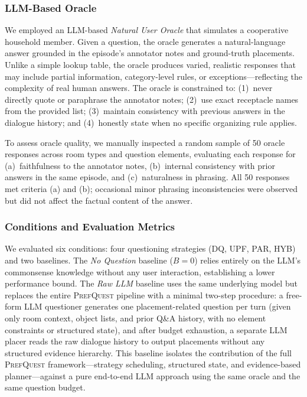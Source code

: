 \documentclass[manuscript,review,anonymous]{acmart}
\begin{document}
{\subsubsection{LLM-Based Oracle}

We employed an LLM-based \textit{Natural User Oracle} that simulates a cooperative household member. Given a question, the oracle generates a natural-language answer grounded in the episode's annotator notes and ground-truth placements. Unlike a simple lookup table, the oracle produces varied, realistic responses that may include partial information, category-level rules, or exceptions---reflecting the complexity of real human answers. The oracle is constrained to: (1)~never directly quote or paraphrase the annotator notes; (2)~use exact receptacle names from the provided list; (3)~maintain consistency with previous answers in the dialogue history; and (4)~honestly state when no specific organizing rule applies.

To assess oracle quality, we manually inspected a random sample of 50 oracle responses across room types and question elements, evaluating each response for (a)~faithfulness to the annotator notes, (b)~internal consistency with prior answers in the same episode, and (c)~naturalness in phrasing. All 50 responses met criteria (a) and (b); occasional minor phrasing inconsistencies were observed but did not affect the factual content of the answer.

\subsubsection{Conditions and Evaluation Metrics}

We evaluated six conditions: four questioning strategies (DQ, UPF, PAR, HYB) and two baselines. The \textit{No Question} baseline ($B=0$) relies entirely on the LLM's commonsense knowledge without any user interaction, establishing a lower performance bound. The \textit{Raw LLM} baseline uses the same underlying model but replaces the entire \textsc{PrefQuest} pipeline with a minimal two-step procedure: a free-form LLM questioner generates one placement-related question per turn (given only room context, object lists, and prior Q\&A history, with no element constraints or structured state), and after budget exhaustion, a separate LLM placer reads the raw dialogue history to output placements without any structured evidence hierarchy. This baseline isolates the contribution of the full \textsc{PrefQuest} framework---strategy scheduling, structured state, and evidence-based planner---against a pure end-to-end LLM approach using the same oracle and the same question budget.

}
\end{document}

